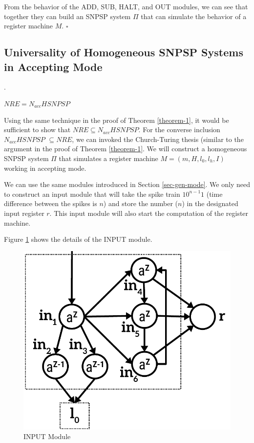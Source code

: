 \documentclass[smallextended]{svjour3}
\begin{document}

From the behavior of the ADD, SUB, HALT, and OUT modules, we can see that together they can build an SNPSP system $\Pi$ that can simulate the
behavior of a register machine $M$. $\square$ 


\subsection{Universality of Homogeneous SNPSP Systems in Accepting Mode}\label{sec-accept}.
\begin{theorem} \label{theorem-2}
$NRE = N_{acc}HSNPSP$ 
\end{theorem}
  
\proof Using the same technique in the proof of Theorem \ref{theorem-1}, it would be sufficient to show that $NRE \subseteq N_{acc}HSNPSP$. For the
converse inclusion $N_{acc}HSNPSP$ $\subseteq NRE$, we can invoked the Church-Turing thesis (similar to the argument in the proof of Theorem 
\ref{theorem-1}. We will construct a homogeneous SNPSP system $\Pi$ that simulates a register machine $M=(m, H, l_0, l_h, I)$ working in accepting mode.

We can use the same modules introduced in Section \ref{sec-gen-mode}. We only need to construct an input module that will take the spike train
$10^{n-1}1$ (time difference between the spikes is $n$) and store the number ($n$) in the designated input register $r$. This input module will
also start the computation of the register machine.

Figure \ref{fig-input} shows the details of the INPUT module.

\begin{figure}
\begin{center}
\includegraphics[scale=0.50]{Fig4.pdf}
\caption{INPUT Module}
\label{fig-input}
\end{center}
\end{figure}   
\end{document}
